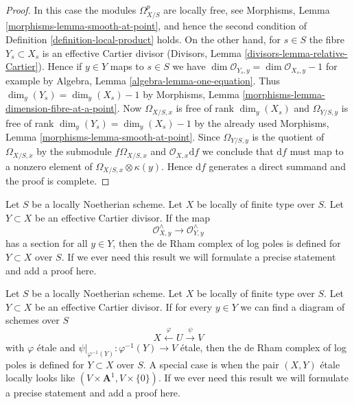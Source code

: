\begin{proof}
In this case the modules $\Omega^p_{X/S}$ are locally free, see
Morphisms, Lemma \ref{morphisms-lemma-smooth-at-point}, and hence the second
condition of Definition \ref{definition-local-product} holds.
On the other hand, for $s \in S$ the fibre $Y_s \subset X_s$ is
an effective Cartier divisor
(Divisors, Lemma \ref{divisors-lemma-relative-Cartier}).
Hence if $y \in Y$ maps to $s \in S$ we have
$\dim \mathcal{O}_{Y_s, y} = \dim \mathcal{O}_{X_s, y} - 1$
for example by Algebra, Lemma \ref{algebra-lemma-one-equation}.
Thus $\dim_y(Y_s) = \dim_y(X_s) - 1$ by
Morphisms, Lemma \ref{morphisms-lemma-dimension-fibre-at-a-point}.
Now $\Omega_{X/S, x}$ is free of rank $\dim_y(X_s)$
and $\Omega_{Y/S, y}$ is free of rank $\dim_y(Y_s) = \dim_y(X_s) - 1$ by
the already used Morphisms, Lemma \ref{morphisms-lemma-smooth-at-point}.
Since $\Omega_{Y/S, y}$ is the quotient of
$\Omega_{X/S, x}$ by the submodule $f\Omega_{X/S, x}$ and
$\mathcal{O}_{X, x}\text{d}f$ we conclude that $\text{d}f$
must map to a nonzero element of $\Omega_{X/S, x} \otimes \kappa(y)$.
Hence $\text{d}f$ generates a direct summand and the proof is complete.
\end{proof}

\begin{remark}
\label{remark-check-log-completion-1}
Let $S$ be a locally Noetherian scheme. Let $X$ be locally of finite
type over $S$. Let $Y \subset X$ be an effective Cartier divisor.
If the map
$$
\mathcal{O}_{X, y}^\wedge \longrightarrow \mathcal{O}_{Y, y}^\wedge
$$
has a section for all $y \in Y$, then
the de Rham complex of log poles is defined for $Y \subset X$ over $S$.
If we ever need this result we will formulate a precise statement and
add a proof here.
\end{remark}

\begin{remark}
\label{remark-check-log-completion-2}
Let $S$ be a locally Noetherian scheme. Let $X$ be locally of finite
type over $S$. Let $Y \subset X$ be an effective Cartier divisor.
If for every $y \in Y$ we can find a diagram of schemes over $S$
$$
X \xleftarrow{\varphi} U \xrightarrow{\psi} V
$$
with $\varphi$ \'etale and $\psi|_{\varphi^{-1}(Y)} : \varphi^{-1}(Y) \to V$
\'etale, then the de Rham complex of log poles is defined for
$Y \subset X$ over $S$. A special case is when the pair $(X, Y)$
\'etale locally looks like $(V \times \mathbf{A}^1, V \times \{0\})$.
If we ever need this result we will formulate
a precise statement and add a proof here.
\end{remark}

















